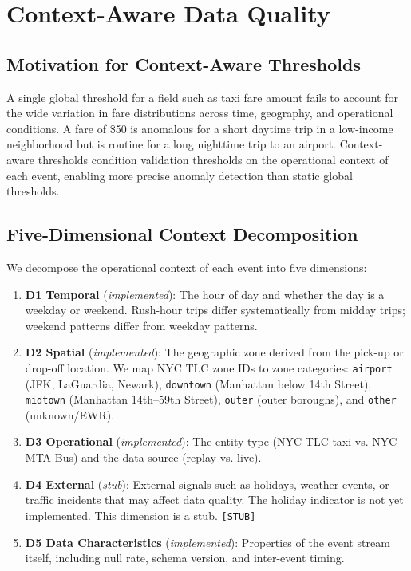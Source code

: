 \section{Context-Aware Data Quality}
\label{sec:context-aware-dq}

\subsection{Motivation for Context-Aware Thresholds}

A single global threshold for a field such as taxi fare amount fails to
account for the wide variation in fare distributions across time, geography,
and operational conditions. A fare of \$50 is anomalous for a short daytime
trip in a low-income neighborhood but is routine for a long nighttime trip
to an airport. Context-aware thresholds condition validation thresholds on
the operational context of each event, enabling more precise anomaly
detection than static global thresholds.

\subsection{Five-Dimensional Context Decomposition}

We decompose the operational context of each event into five dimensions:

\begin{enumerate}
  \item \textbf{D1 Temporal} (\textit{implemented}): The hour of day and
        whether the day is a weekday or weekend. Rush-hour trips differ
        systematically from midday trips; weekend patterns differ from
        weekday patterns.

  \item \textbf{D2 Spatial} (\textit{implemented}): The geographic zone
        derived from the pick-up or drop-off location. We map NYC TLC
        zone IDs to zone categories: \texttt{airport} (JFK, LaGuardia,
        Newark), \texttt{downtown} (Manhattan below 14th Street),
        \texttt{midtown} (Manhattan 14th--59th Street), \texttt{outer}
        (outer boroughs), and \texttt{other} (unknown/EWR).

  \item \textbf{D3 Operational} (\textit{implemented}): The entity type
        (NYC TLC taxi vs. NYC MTA Bus) and the data source
        (replay vs. live).

  \item \textbf{D4 External} (\textit{stub}): External signals such as
        holidays, weather events, or traffic incidents that may affect
        data quality. The holiday indicator is not yet implemented.
        This dimension is a stub.
        \texttt{[STUB]}

  \item \textbf{D5 Data Characteristics} (\textit{implemented}): Properties
        of the event stream itself, including null rate, schema version,
        and inter-event timing.
\end{enumerate}

